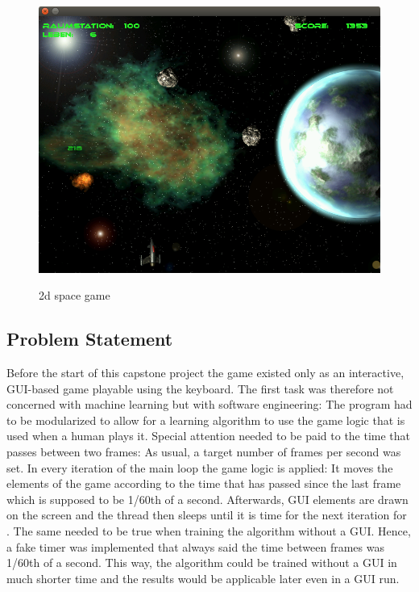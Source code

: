 \documentclass[a4paper,10pt]{article}
\begin{document}
\begin{figure}
 \centering
 \includegraphics[width=\linewidth]{game3.png}
 \label{fig:game}
 \caption{2d space game}
\end{figure}

\subsection{Problem Statement}
\label{problemstatement}
Before the start of this capstone project the game existed only as an interactive, GUI-based game playable using the keyboard. 
The first task was therefore not concerned with machine learning but with software engineering:
The program had to be modularized to allow for a learning algorithm to use the game logic that is used when a human plays it.
Special attention needed to be paid to the time that passes between two frames:
As usual, a target number of frames per second was set.
In every iteration of the main loop the game logic is applied: It moves the elements of the game according to the time that has passed since the last frame which is supposed to be 1/60th of a second.
Afterwards, GUI elements are drawn on the screen and the thread then sleeps until it is time for the next iteration for .
The same needed to be true when training the algorithm without a GUI.
Hence, a fake timer was implemented that always said the time between frames was 1/60th of a second.
This way, the algorithm could be trained without a GUI in much shorter time and the results would be applicable later even in a GUI run.
\end{document}
